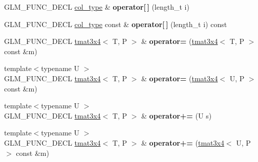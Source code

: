 \begin{DoxyCompactItemize}
\item 
\hypertarget{structglm_1_1detail_1_1tmat3x4_a787deb7b8f8d3d0f2e1e5df0c6f47bc7}{G\-L\-M\-\_\-\-F\-U\-N\-C\-\_\-\-D\-E\-C\-L \hyperlink{structglm_1_1detail_1_1tvec4}{col\-\_\-type} \& {\bfseries operator\mbox{[}$\,$\mbox{]}} (length\-\_\-t i)}\label{structglm_1_1detail_1_1tmat3x4_a787deb7b8f8d3d0f2e1e5df0c6f47bc7}

\item 
\hypertarget{structglm_1_1detail_1_1tmat3x4_a529efc696d18ecbffe57c3726e453cad}{G\-L\-M\-\_\-\-F\-U\-N\-C\-\_\-\-D\-E\-C\-L \hyperlink{structglm_1_1detail_1_1tvec4}{col\-\_\-type} const \& {\bfseries operator\mbox{[}$\,$\mbox{]}} (length\-\_\-t i) const }\label{structglm_1_1detail_1_1tmat3x4_a529efc696d18ecbffe57c3726e453cad}

\item 
\hypertarget{structglm_1_1detail_1_1tmat3x4_a235b6fc15047de1d9415b3e1027bc2e4}{G\-L\-M\-\_\-\-F\-U\-N\-C\-\_\-\-D\-E\-C\-L \hyperlink{structglm_1_1detail_1_1tmat3x4}{tmat3x4}$<$ T, P $>$ \& {\bfseries operator=} (\hyperlink{structglm_1_1detail_1_1tmat3x4}{tmat3x4}$<$ T, P $>$ const \&m)}\label{structglm_1_1detail_1_1tmat3x4_a235b6fc15047de1d9415b3e1027bc2e4}

\item 
\hypertarget{structglm_1_1detail_1_1tmat3x4_a3e6b142f80982e1d1722f75a6d146090}{{\footnotesize template$<$typename U $>$ }\\G\-L\-M\-\_\-\-F\-U\-N\-C\-\_\-\-D\-E\-C\-L \hyperlink{structglm_1_1detail_1_1tmat3x4}{tmat3x4}$<$ T, P $>$ \& {\bfseries operator=} (\hyperlink{structglm_1_1detail_1_1tmat3x4}{tmat3x4}$<$ U, P $>$ const \&m)}\label{structglm_1_1detail_1_1tmat3x4_a3e6b142f80982e1d1722f75a6d146090}

\item 
\hypertarget{structglm_1_1detail_1_1tmat3x4_ab57d6efb45e4b2e6fd77a12486c4daa8}{{\footnotesize template$<$typename U $>$ }\\G\-L\-M\-\_\-\-F\-U\-N\-C\-\_\-\-D\-E\-C\-L \hyperlink{structglm_1_1detail_1_1tmat3x4}{tmat3x4}$<$ T, P $>$ \& {\bfseries operator+=} (U s)}\label{structglm_1_1detail_1_1tmat3x4_ab57d6efb45e4b2e6fd77a12486c4daa8}

\item 
\hypertarget{structglm_1_1detail_1_1tmat3x4_ac18c19db6f4e348c972e9f937522eaca}{{\footnotesize template$<$typename U $>$ }\\G\-L\-M\-\_\-\-F\-U\-N\-C\-\_\-\-D\-E\-C\-L \hyperlink{structglm_1_1detail_1_1tmat3x4}{tmat3x4}$<$ T, P $>$ \& {\bfseries operator+=} (\hyperlink{structglm_1_1detail_1_1tmat3x4}{tmat3x4}$<$ U, P $>$ const \&m)}\label{structglm_1_1detail_1_1tmat3x4_ac18c19db6f4e348c972e9f937522eaca}


\end{DoxyCompactItemize}
